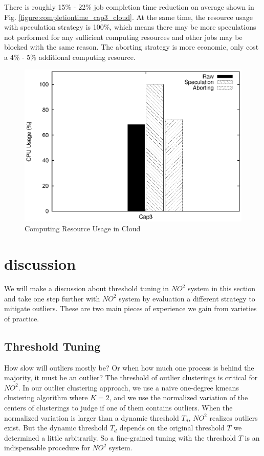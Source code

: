 There is roughly 15\% - 22\% job completion time reduction on average shown in Fig. \ref{figure:completiontime_cap3_cloud}. At the same time, the resource usage with speculation strategy is 100\%, which means there may be more speculations not performed for any sufficient computing resources and other jobs may be blocked with the same reason. The aborting strategy is more economic, only cost a 4\% - 5\% additional computing resource.

\begin{figure}
\centering
\includegraphics[width=0.9\columnwidth]{figures/cloud_resource_usage.eps}
\caption{Computing Resource Usage in Cloud}
\label{figure:resourceusage_cloud}
\end{figure}

\section{discussion}

We will make a discussion about threshold tuning in $NO^2$ system in this section and take one step further with $NO^2$ system by evaluation a different strategy to mitigate outliers. These are two main pieces of experience we gain from varieties of practice.

\subsection{Threshold Tuning}

How slow will outliers mostly be? Or when how much one process is behind the majority, it must be an outlier? The threshold of outlier clusterings is critical for $NO^2$. In our outlier clustering approach, we use a naive one-degree kmeans clustering algorithm where $K = 2$, and we use the normalized variation of the centers of clusterings to judge if one of them contains outliers. When the normalized variation is larger than a dynamic threshold $T_d$, $NO^2$ realizes outliers exist. But the dynamic threshold $T_d$ depends on the original threshold $T$ we determined a little arbitrarily. So a fine-grained tuning with the threshold $T$ is an indispensable procedure for $NO^2$ system.

